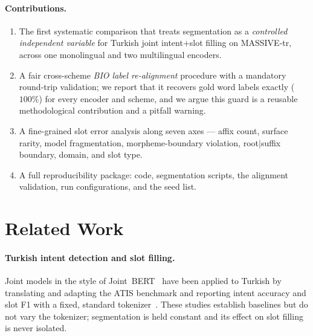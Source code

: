 \documentclass[runningheads]{llncs}
\begin{document}
\paragraph{Contributions.}
\begin{enumerate}
  \item The first systematic comparison that treats segmentation as a
  \emph{controlled independent variable} for Turkish joint intent$+$slot filling
  on MASSIVE-tr, across one monolingual and two multilingual encoders.
  \item A fair cross-scheme \emph{BIO label re-alignment} procedure with a
  mandatory round-trip validation; we report that it recovers gold word labels
  exactly ($100\%$) for every encoder and scheme, and we argue this guard is a
  reusable methodological contribution and a pitfall warning.
  \item A fine-grained slot error analysis along seven axes --- affix count,
  surface rarity, model fragmentation, morpheme-boundary violation, root$|$suffix
  boundary, domain, and slot type.
  \item A full reproducibility package: code, segmentation scripts, the alignment
  validation, run configurations, and the seed list.
\end{enumerate}

\section{Related Work}
\paragraph{Turkish intent detection and slot filling.}
Joint models in the style of Joint~BERT~\cite{chen2019bert} have been applied to
Turkish by translating and adapting the ATIS benchmark and reporting intent
accuracy and slot F1 with a fixed, standard tokenizer~\cite{buyuk2023,
turkishatis2020}. These studies establish baselines but do not vary the
tokenizer; segmentation is held constant and its effect on slot filling is never
isolated.
\end{document}
